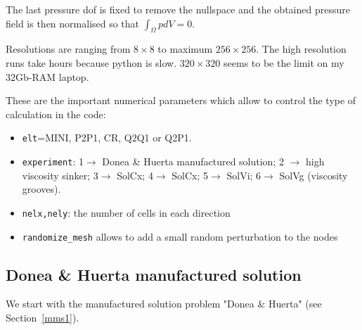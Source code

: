 The last pressure dof is fixed to remove the nullspace and the obtained pressure field
is then normalised so that $\int_\Omega p dV = 0$.

Resolutions are ranging from $8\times 8$ to maximum $256\times256$. The high resolution runs take hours 
because python is slow. $320\times 320$ seems to be the limit on my 32Gb-RAM laptop.  

These are the important numerical parameters which allow to control the type of calculation in the code:
\begin{itemize}
\item {\tt elt}=MINI, P2P1, CR, Q2Q1 or Q2P1.
\item {\tt experiment}: 1$\rightarrow$ Donea \& Huerta manufactured solution;
2 $\rightarrow$ high viscosity sinker; 3$\rightarrow$ SolCx; 4$\rightarrow$ SolCx; 
5$\rightarrow$ SolVi; 6$\rightarrow$ SolVg (viscosity grooves).
\item {\tt nelx,nely}:  the number of cells in each direction
\item {\tt randomize\_mesh} allows to add a small random perturbation to the nodes
\end{itemize}

\newpage
\subsection*{Donea \& Huerta manufactured solution}

We start with the manufactured solution problem "Donea \& Huerta" (see Section~\ref{mms1}).

